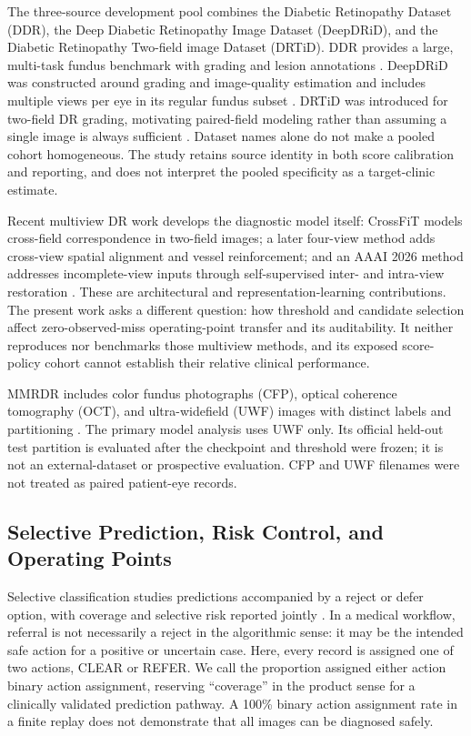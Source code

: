 \documentclass{ieeeaccess}
\begin{document}
The three-source development pool combines the Diabetic Retinopathy Dataset (DDR), the Deep Diabetic Retinopathy Image Dataset (DeepDRiD), and the Diabetic Retinopathy Two-field image Dataset (DRTiD). DDR provides a large, multi-task fundus benchmark with grading and lesion annotations \cite{ddr}. DeepDRiD was constructed around grading and image-quality estimation and includes multiple views per eye in its regular fundus subset \cite{deepdrid}. DRTiD was introduced for two-field DR grading, motivating paired-field modeling rather than assuming a single image is always sufficient \cite{drtidpaper}. Dataset names alone do not make a pooled cohort homogeneous. The study retains source identity in both score calibration and reporting, and does not interpret the pooled specificity as a target-clinic estimate.

Recent multiview DR work develops the diagnostic model itself: CrossFiT models cross-field correspondence in two-field images; a later four-view method adds cross-view spatial alignment and vessel reinforcement; and an AAAI 2026 method addresses incomplete-view inputs through self-supervised inter- and intra-view restoration \cite{drtidpaper,lin2025multiview,wu2026incompletemv}. These are architectural and representation-learning contributions. The present work asks a different question: how threshold and candidate selection affect zero-observed-miss operating-point transfer and its auditability. It neither reproduces nor benchmarks those multiview methods, and its exposed score-policy cohort cannot establish their relative clinical performance.

MMRDR includes color fundus photographs (CFP), optical coherence tomography (OCT), and ultra-widefield (UWF) images with distinct labels and partitioning \cite{mmrdr,mmrdrdata}. The primary model analysis uses UWF only. Its official held-out test partition is evaluated after the checkpoint and threshold were frozen; it is not an external-dataset or prospective evaluation. CFP and UWF filenames were not treated as paired patient-eye records.

\subsection{Selective Prediction, Risk Control, and Operating Points}
Selective classification studies predictions accompanied by a reject or defer option, with coverage and selective risk reported jointly \cite{geifman2017,selectivenet}. In a medical workflow, referral is not necessarily a reject in the algorithmic sense: it may be the intended safe action for a positive or uncertain case. Here, every record is assigned one of two actions, CLEAR or REFER. We call the proportion assigned either action binary action assignment, reserving ``coverage'' in the product sense for a clinically validated prediction pathway. A 100\% binary action assignment rate in a finite replay does not demonstrate that all images can be diagnosed safely.
\end{document}
